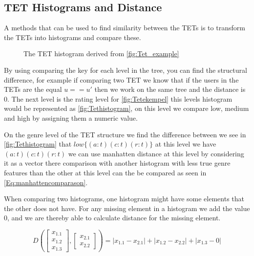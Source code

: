 \subsection{TET Histograms and Distance}
	A methods that can be used to find similarity between the TETs is to transform the TETs into histograms and compare these\cite{JAEGER201330}. 
	\begin{figure}[H]
		\centering
		\begin{adjustbox}{width=0.5\textwidth}
			
		\end{adjustbox}
		\caption{The TET histogram derived from \autoref{fig:Tet_example}}
		\label{fig:Tethistogram}
	\end{figure}
	
	By using comparing the key for each level in the tree, you can find the structural difference, for example if comparing two TET we know that if the users in the TETs are the equal $u == u'$ then we work on the same tree and the distance is $0$. The next level is the rating level for \autoref{fig:Tetekempel} this levels histogram would be represented as \autoref{fig:Tethistogram}, on this level we compare low, medium and high by assigning them a numeric value.
	
	On the genre level of the TET structure we find the difference between we see in \autoref{fig:Tethistogram} that $low\{(a:t)(c:t)(r:t)\}$ at this level we have $(a:t)(c:t)(r:t)$ we can use manhatten distance at this level by considering it as a vector there comparison with another histogram with less true genre features than the other at this level can the be compared as seen in \autoref{Eq:manhattencomparason}\cite{singh2013k}.
	
	When comparing two histograms, one histogram might have some elements that the other does not have. For any missing element in a histogram we add the value $0$, and we are thereby able to calculate distance for the missing element.
	
	\begin{equation}\label{Eq:manhattencomparason}
	D(\begin{bmatrix}
	x_{1.1} \\
	x_{1.2} \\
	x_{1.3}
	\end{bmatrix},
	\begin{bmatrix}
	x_{2.1} \\
	x_{2.2}
	\end{bmatrix})= |x_{1.1} - x_{2.1}| + |x_{1.2} - x_{2.2}| + |x_{1.3} - 0|
	\end{equation}
	
